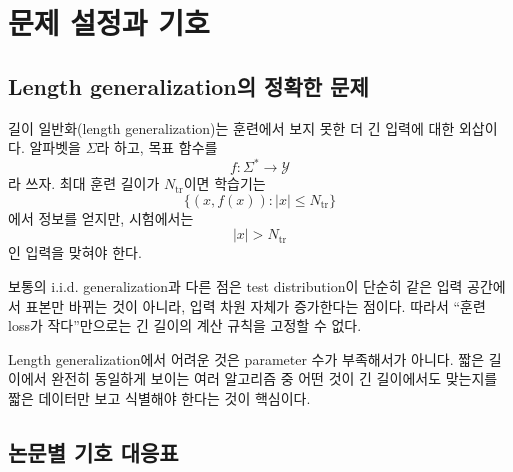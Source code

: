 \documentclass[11pt,a4paper,oneside,openany]{memoir}
\newcommand{\abs}[1]{\left\lvert #1\right\rvert}
\theoremstyle{definition}
\begin{document}
\tableofcontents*
\clearpage

\chapter{문제 설정과 기호}

\section{Length generalization의 정확한 문제}

길이 일반화(length generalization)는 훈련에서 보지 못한 더 긴 입력에 대한 외삽이다.
알파벳을 $\Sigma$라 하고, 목표 함수를
\[
f:\Sigma^*\to\mathcal Y
\]
라 쓰자. 최대 훈련 길이가 $N_{\mathrm{tr}}$이면 학습기는
\[
\{(x,f(x)):\abs{x}\le N_{\mathrm{tr}}\}
\]
에서 정보를 얻지만, 시험에서는
\[
\abs{x}>N_{\mathrm{tr}}
\]
인 입력을 맞혀야 한다.

보통의 i.i.d. generalization과 다른 점은 test distribution이 단순히 같은 입력 공간에서 표본만 바뀌는 것이 아니라,
입력 차원 자체가 증가한다는 점이다. 따라서 ``훈련 loss가 작다''만으로는 긴 길이의 계산 규칙을 고정할 수 없다.

\begin{keybox}
Length generalization에서 어려운 것은 parameter 수가 부족해서가 아니다.
짧은 길이에서 완전히 동일하게 보이는 여러 알고리즘 중 어떤 것이 긴 길이에서도 맞는지를 짧은 데이터만 보고 식별해야 한다는 것이 핵심이다.
\end{keybox}

\section{논문별 기호 대응표}
\end{document}
